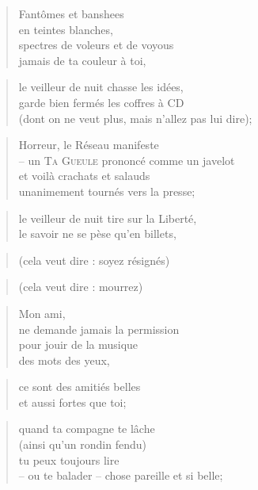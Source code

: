   \begin{verse}
    Fantômes et banshees\\
    en teintes blanches,\\
    spectres de voleurs et de voyous\\
    jamais de ta couleur à toi,
  \end{verse}
  \begin{verse}
    le veilleur de nuit chasse les idées,\\
    garde bien fermés les coffres à CD\\
    (dont on ne veut plus, mais n’allez pas lui dire);\\
  \end{verse}
  \begin{verse}
    Horreur, le Réseau manifeste\\
    -- un \textsc{Ta Gueule} prononcé comme un javelot\\
    et voilà crachats et salauds\\
    unanimement tournés vers la presse;
  \end{verse}
  \begin{verse}
    le veilleur de nuit tire sur la Liberté,\\
    le savoir ne se pèse qu’en billets,
  \end{verse}
  \begin{verse}
    (cela veut dire : soyez résignés)
  \end{verse}
  \begin{verse}
    (cela veut dire : mourrez)
  \end{verse}
  \begin{verse}
    Mon ami,\\
    ne demande jamais la permission\\
    pour jouir de la musique\\
    des mots des yeux,
  \end{verse}
  \begin{verse}
    ce sont des amitiés belles\\
    et aussi fortes que toi;
  \end{verse}
  \begin{verse}
    quand ta compagne te lâche\\
    (ainsi qu’un rondin fendu)\\
    tu peux toujours lire\\
    -- ou te balader -- chose pareille et si belle;
  \end{verse}

